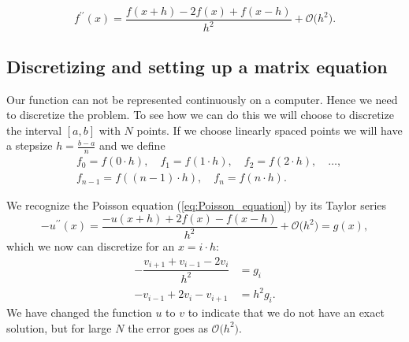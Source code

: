 \documentclass{emulateapj}
\begin{document}
\begin{equation}\label{eq:f_double_derivative_taylor}
    f^{\prime\prime}(x) = \frac{f(x+h) - 2f(x)+ f(x-h)}{h^{2}} + \mathcal{O}\big(h^{2}\big).
\end{equation}
\subsection{Discretizing and setting up a matrix equation}
Our function can not be represented continuously on a computer. Hence we need to discretize the problem. To see how we can do this we will choose to discretize the interval \([a,b]\) with \(N\) points. If we choose linearly spaced points we will have a stepsize \(h = \frac{b - a}{n}\) and we define 
\begin{align*}
    &f_{0}=f(0\cdot h),\quad f_{1}=f(1\cdot h),\quad f_{2}=f(2\cdot h),\quad \ldots,\\ &f_{n-1}=f((n-1)\cdot h),\quad f_{n}=f(n\cdot h).
\end{align*}

We recognize the Poisson equation (\ref{eq:Poisson_equation}) by its Taylor series
\begin{equation}\label{eq:f_double_derivative_taylor}
    -u^{\prime\prime}(x) = \frac{-u(x+h) + 2f(x) - f(x-h)}{h^{2}} + \mathcal{O}\big(h^{2}\big) = g(x),
\end{equation}
which we now can discretize for an \(x=i\cdot h\):
\begin{align}\label{eq:f_double_derivative_discrete}
    -\dfrac{v_{i+1} + v_{i-1} - 2v_{i}}{h^{2}} &= g_{i}\nonumber
    \\
    -v_{i-1} + 2v_{i} - v_{i+1} &= h^{2} g_{i}.
\end{align}
We have changed the function \(u\) to \(v\) to indicate that we do not have an exact solution, but for large \(N\) the error goes as \(\mathcal{O}\big(h^{2}\big)\). 

\end{document}
